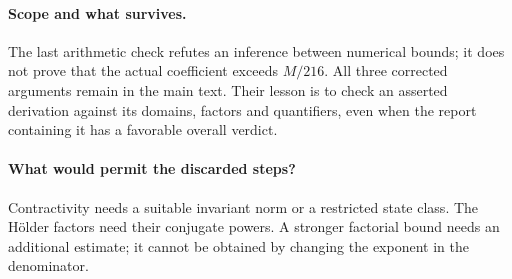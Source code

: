 \paragraph{Scope and what survives.}
The last arithmetic check refutes an inference between numerical bounds;
it does not prove that the actual coefficient exceeds $M/216$.
All three corrected arguments remain in the main text. Their lesson is to
check an asserted derivation against its domains, factors and quantifiers,
even when the report containing it has a favorable overall verdict.

\paragraph{What would permit the discarded steps?}
Contractivity needs a suitable invariant norm or a restricted state class.
The H\"older factors need their conjugate powers. A stronger factorial
bound needs an additional estimate; it cannot be obtained by changing the
exponent in the denominator.
